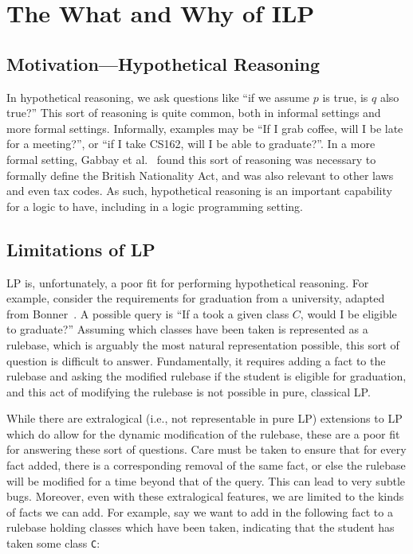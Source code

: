\section{The What and Why of ILP}
\subsection{Motivation---Hypothetical Reasoning}
In hypothetical reasoning, we ask questions like ``if we assume $p$ is true, is $q$ also true?''
This sort of reasoning is quite common, both in informal settings and more formal settings.
Informally, examples may be ``If I grab coffee, will I be late for a meeting?'', or ``if I take CS162, will I be able to graduate?''.
In a more formal setting, Gabbay et al.~\cite{Gabbay} found this sort of reasoning was necessary to formally define the British Nationality Act, and was also relevant to other laws and even tax codes.
As such, hypothetical reasoning is an important capability for a logic to have, including in a logic programming setting.

\subsection{Limitations of LP}
\label{sec:lp_limitations}
LP is, unfortunately, a poor fit for performing hypothetical reasoning.
For example, consider the requirements for graduation from a university, adapted from Bonner~\cite{Bonner88}.
A possible query is ``If a took a given class $C$, would I be eligible to graduate?''
Assuming which classes have been taken is represented as a rulebase, which is arguably the most natural representation possible, this sort of question is difficult to answer.
Fundamentally, it requires adding a fact to the rulebase and asking the modified rulebase if the student is eligible for graduation, and this act of modifying the rulebase is not possible in pure, classical LP.

While there are extralogical (i.e., not representable in pure LP) extensions to LP which do allow for the dynamic modification of the rulebase, these are a poor fit for answering these sort of questions.
Care must be taken to ensure that for every fact added, there is a corresponding removal of the same fact, or else the rulebase will be modified for a time beyond that of the query.
This can lead to very subtle bugs.
Moreover, even with these extralogical features, we are limited to the kinds of facts we can add.
For example, say we want to add in the following fact to a rulebase holding classes which have been taken, indicating that the student has taken some class \texttt{C}:

